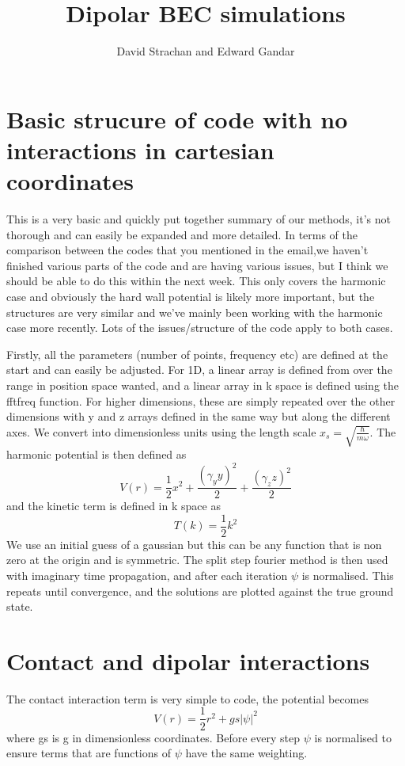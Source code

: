 \documentclass[12pt]{article}
\begin{document}
\author{ David Strachan and Edward Gandar }
\title{Dipolar BEC simulations}

\maketitle

\tableofcontents

\section{Basic strucure of code with no interactions in cartesian coordinates}
This is a very basic and quickly put together summary of our methods, it's not thorough and can easily be expanded and more detailed. In terms of the comparison between the codes that you mentioned in the email,we haven't finished various parts of the code and are having various issues, but I think we should be able to do this within the next week. This only covers the harmonic case and obviously the hard wall potential is likely more important, but the structures are very similar and we've mainly been working with the harmonic case more recently. Lots of the issues/structure of the code apply to both cases.

Firstly, all the parameters (number of points, frequency etc) are defined at the start and can easily be adjusted. For 1D, a linear array is defined from over the range in position space wanted, and a linear array in k space is defined using the fftfreq function. For higher dimensions, these are simply repeated over the other dimensions with y and z arrays defined in the same way but along the different axes. We convert into dimensionless units using the length scale $x_{s} = \sqrt{\frac{\hbar}{m\omega}}$. The harmonic potential is then defined as 
\begin{equation}
V(r) = \frac{1}{2}x^{2}+\frac{(\gamma_yy)^{2}}{2}+\frac{(\gamma_zz)^{2}}{2}
\end{equation}
and the kinetic term is defined in k space as 
\begin{equation}
T(k) = \frac{1}{2}k^{2}
\end{equation} 
We use an initial guess of a gaussian but this can be any function that is non zero at the origin and is symmetric. The split step fourier method is then used with imaginary time propagation, and after each iteration $\psi$ is normalised. This repeats until convergence, and the solutions are plotted against the true ground state.
\section{Contact and dipolar interactions}
The contact interaction term is very simple to code, the potential becomes 
\begin{equation}
V(r) = \frac{1}{2}r^{2}+gs|\psi|^{2}
\end{equation}
where gs is g in dimensionless coordinates. Before every step $\psi$ is normalised to ensure terms that are functions of $\psi$ have the same weighting.
 
\end{document}
